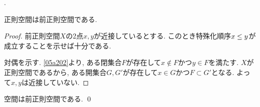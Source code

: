 \documentclass[uplatex, dvipdfmx, a4paper, 12pt, class=jsbook, crop=false]{standalone}
\begin{document}
\begin{example}[推移空間かつ対称空間であるが前正則ではない空間]
	\WIP.
\end{example}

\begin{proposition}
	正則空間は前正則空間である.
\end{proposition}

\begin{proof}
	前正則空間\(X\)の2点\(x, y\)が近接しているとする.
	このとき特殊化順序\(x \leq y\)が成立することを示せば十分である.

	対偶を示す.
	\cref{05a202}より,
	ある閉集合\(F\)が存在して\(x \not\in F\)かつ\(y \in F\)を満たす.
	\(X\)が正則空間であるから,
	ある開集合\(G, G'\)が存在して\(x \in G\)かつ\(F \subset G'\)となる.
	よって\(x, y\)は近接していない.
\end{proof}

\begin{proposition}
	\Hausdorff 空間は前正則空間である.
	\qed
\end{proposition}
\end{document}
